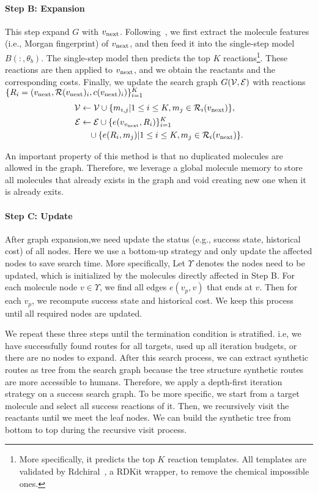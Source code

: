 \documentclass[sigconf]{acmart}
\begin{document}
\paragraph{Step B: Expansion}
This step expand $G$ with $v_{\text{next}}$.
Following~\cite{Chen2020,Kim2021}, we first extract the molecule features (i.e., Morgan fingerprint) of $v_{\text{next}}$, and then feed it into the single-step model $B(:, \theta_b)$.
The single-step model then predicts the top $K$ reactions\footnote{More specifically, it predicts the top $K$ reaction templates. All templates are validated by Rdchiral~\citep{coley2019rdchiral}, a RDKit wrapper,  to remove the chemical impossible ones.}. These reactions are then applied to $v_{\text{next}}$, and we obtain the reactants and the corresponding costs.
Finally, we update the search graph $G(\mathcal{V}, \mathcal{E})$ with reactions $\{{R}_i = (v_{\text{next}}, \mathcal{R}(v_{\text{next}})_i, c(v_{\text{next}})_i)\}_{i=1}^{K}$ 
\begin{align}
    \mathcal{V} & \leftarrow \mathcal{V} \cup \{m_{i,j} | 1 \le i \le K, m_j \in \mathcal{R}_i(v_{\text{next}}) \}, \label{eq:u1} \\
    \mathcal{E} & \leftarrow \mathcal{E} \cup \{ e(v_{v_{\text{next}}}, R_i) \}_{i=1}^K \nonumber \label{eq:u2}\\
    & \quad \cup \{ e(R_i, m_j) | 1 \le i \le K, m_j \in \mathcal{R}_i(v_{\text{next}}) \}.
\end{align}

An important property of this method is that no duplicated molecules are allowed in the graph.
Therefore, we leverage a global molecule memory to store all molecules that already exists in the graph and void creating new one when it is already exits.

\paragraph{Step C: Update}
After graph expansion,we need update the status (e.g., success state, historical cost) of all nodes.
Here we use a bottom-up strategy and only update the affected nodes to save search time.
More specifically, Let $\Upsilon$ denotes the nodes need to be updated, which is initialized by the molecules directly affected in Step B.
For each molecule node $v \in \Upsilon$, we find all edges $e(v_p, v)$ that ends at $v$.
Then for each $v_p$, we recompute success state and historical cost.
We keep this process until all required nodes are updated.

We repeat these three steps until the termination condition is stratified.
i.e, we have successfully found routes for all targets, used up all iteration budgets, or there are no nodes to expand.
After this search process, we can extract synthetic routes as tree from the search graph because the tree structure synthetic routes are more accessible to humans.
Therefore, we apply a depth-first iteration strategy on a success search graph.
To be more specific, we start from a target molecule and select all success reactions of it. Then, we recursively visit the reactants until we meet the leaf nodes.
We can build the synthetic tree from bottom to top during the recursive visit process.
\end{document}
